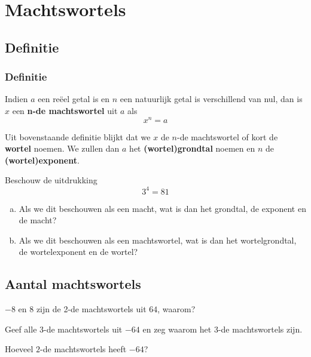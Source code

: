 \documentclass[12pt,twoside,a4paper]{article}
\begin{document}
\cleardoublepage
\section{Machtswortels}

\subsection{Definitie}

\subsubsection*{Definitie}
\begin{mdframed}
Indien $a$ een reëel getal is en $n$ een natuurlijk getal is verschillend van nul, dan is $x$ een {\bf n-de machtswortel} uit $a$ als
$$x^n=a$$
\end{mdframed}

Uit bovenstaande definitie blijkt dat we $x$ de $n$-de machtswortel of kort de {\bf wortel} noemen. We zullen dan $a$ het {\bf (wortel)grondtal} noemen en $n$ de {\bf (wortel)exponent}.

\begin{oefening}
  Beschouw de uitdrukking
  $$ 3^4=81 $$
  \begin{enumerate}[(a)]
  \item Als we dit beschouwen als een macht, wat is dan het grondtal, de exponent en de macht?
    \item Als we dit beschouwen als een machtswortel, wat is dan het wortelgrondtal, de wortelexponent en de wortel?
  \end{enumerate}
\end{oefening}

\subsection{Aantal machtswortels}

\begin{oefening}
$-8$ en $8$ zijn de 2-de machtswortels uit $64$, waarom?
\end{oefening}

\begin{oefening}
Geef alle $3$-de machtswortels uit $-64$ en zeg waarom het $3$-de machtswortels zijn.
\end{oefening}

\begin{oefening}
Hoeveel $2$-de machtswortels heeft $-64$?
\end{oefening}
\end{document}
